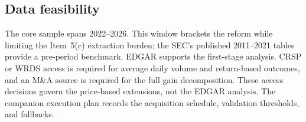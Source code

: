 \subsection{Data feasibility}
\label{sec:data-feasibility}

The core sample spans 2022--2026. This window brackets the reform while limiting
the Item~5(c) extraction burden; the SEC's published 2011--2021 tables provide a
pre-period benchmark. EDGAR supports the first-stage analysis. CRSP or WRDS
access is required for average daily volume and return-based outcomes, and an
M\&A source is required for the full gain decomposition. These access decisions
govern the price-based extensions, not the EDGAR analysis. The companion
execution plan records the acquisition schedule, validation thresholds, and
fallbacks.

